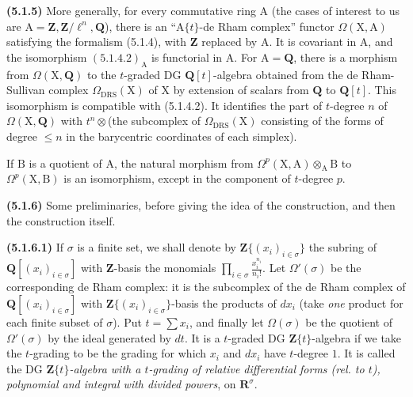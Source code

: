\documentclass[11pt,leqno]{article}
\begin{document}
\textbf{(5.1.5)} More generally, for every commutative ring \(\mathrm{A}\) (the cases of interest to us are \(\mathrm{A}=\mathbf{Z},\mathbf{Z}/\ell^n,\mathbf{Q}\)), there is an “\(\mathrm{A}\{t\}\)-de Rham complex” functor \(\Omega(\mathrm{X},\mathrm{A})\) satisfying the formalism (5.1.4), with \(\mathbf{Z}\) replaced by \(\mathrm{A}\). It is covariant in \(\mathrm{A}\), and the isomorphism \((5.1.4.2)_{\mathrm{A}}\) is functorial in \(\mathrm{A}\). For \(\mathrm{A}=\mathbf{Q}\), there is a morphism from \(\Omega(\mathrm{X},\mathbf{Q})\) to the \(t\)-graded DG \(\mathbf{Q}[t]\)-algebra obtained from the de Rham-Sullivan complex \(\Omega_{\mathrm{DRS}}(\mathrm{X})\) of \(\mathrm{X}\) by extension of scalars from \(\mathbf{Q}\) to \(\mathbf{Q}[t]\). This isomorphism is compatible with (5.1.4.2). It identifies the part of \(t\)-degree \(n\) of \(\Omega(\mathrm{X},\mathbf{Q})\) with \(t^n\otimes\)(the subcomplex of \(\Omega_{\mathrm{DRS}}(\mathrm{X})\) consisting of the forms of degree \(\leq n\) in the barycentric coordinates of each simplex).

If \(\mathrm{B}\) is a quotient of \(\mathrm{A}\), the natural morphism from \(\Omega^p(\mathrm{X},\mathrm{A})\otimes_{\mathrm{A}}\mathrm{B}\) to \(\Omega^p(\mathrm{X},\mathrm{B})\) is an isomorphism, except in the component of \(t\)-degree \(p\).

\textbf{(5.1.6)} Some preliminaries, before giving the idea of the construction, and then the construction itself.

\textbf{(5.1.6.1)} If \(\sigma\) is a finite set, we shall denote by \(\mathbf{Z}\{(x_i)_{i\in\sigma}\}\) the subring of \(\mathbf{Q}[(x_i)_{i\in\sigma}]\) with \(\mathbf{Z}\)-basis the monomials \(\prod\limits_{i\in\sigma}\frac{x_i^{n_i}}{n_i!}\). Let \(\Omega'(\sigma)\) be the corresponding de Rham complex: it is the subcomplex of the de Rham complex of \(\mathbf{Q}[(x_i)_{i\in\sigma}]\) with \(\mathbf{Z}\{(x_i)_{i\in\sigma}\}\)-basis the products of \(dx_i\) (take \textit{one} product for each finite subset of \(\sigma\)). Put \(t=\sum x_i\), and finally let \(\Omega(\sigma)\) be the quotient of \(\Omega'(\sigma)\) by the ideal generated by \(dt\). It is a \(t\)-graded DG \(\mathbf{Z}\{t\}\)-algebra if we take the \(t\)-grading to be the grading for which \(x_i\) and \(dx_i\) have \(t\)-degree \(1\). It is called the DG \(\mathbf{Z}\{t\}\)\textit{-algebra with a \(t\)-grading} \textit{of relative differential forms (rel. to \(t\)), polynomial and integral with divided powers}, on \(\mathbf{R}^{\sigma}\).
\end{document}
